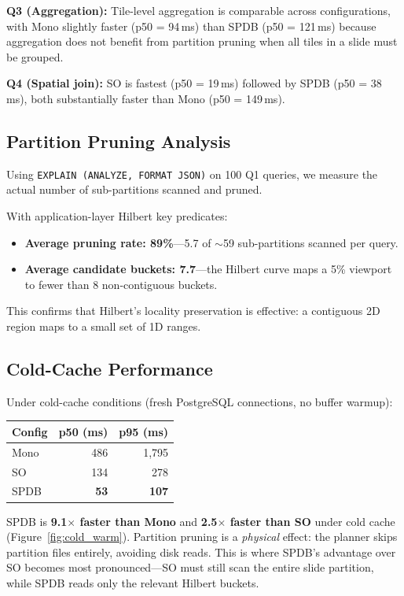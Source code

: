 \documentclass[10pt,twocolumn]{article}
\begin{document}
\textbf{Q3 (Aggregation):} Tile-level aggregation is comparable across configurations, with Mono slightly faster (p50 = 94\,ms) than SPDB (p50 = 121\,ms) because aggregation does not benefit from partition pruning when all tiles in a slide must be grouped.

\textbf{Q4 (Spatial join):} SO is fastest (p50 = 19\,ms) followed by SPDB (p50 = 38\,ms), both substantially faster than Mono (p50 = 149\,ms).

\subsection{Partition Pruning Analysis}
\label{sec:pruning}

Using \texttt{EXPLAIN (ANALYZE, FORMAT JSON)} on 100 Q1 queries, we measure the actual number of sub-partitions scanned and pruned.

With application-layer Hilbert key predicates:
\begin{itemize}
\item \textbf{Average pruning rate: 89\%}---5.7 of $\sim$59 sub-partitions scanned per query.
\item \textbf{Average candidate buckets: 7.7}---the Hilbert curve maps a 5\% viewport to fewer than 8 non-contiguous buckets.
\end{itemize}

This confirms that Hilbert's locality preservation is effective: a contiguous 2D region maps to a small set of 1D ranges.

\subsection{Cold-Cache Performance}

Under cold-cache conditions (fresh PostgreSQL connections, no buffer warmup):

\begin{center}
\begin{tabular}{lrr}
\toprule
\textbf{Config} & \textbf{p50 (ms)} & \textbf{p95 (ms)} \\
\midrule
Mono & 486 & 1{,}795 \\
SO & 134 & 278 \\
SPDB & \textbf{53} & \textbf{107} \\
\bottomrule
\end{tabular}
\end{center}

SPDB is \textbf{9.1$\times$ faster than Mono} and \textbf{2.5$\times$ faster than SO} under cold cache (Figure~\ref{fig:cold_warm}).
Partition pruning is a \emph{physical} effect: the planner skips partition files entirely, avoiding disk reads.
This is where SPDB's advantage over SO becomes most pronounced---SO must still scan the entire slide partition, while SPDB reads only the relevant Hilbert buckets.
\end{document}
